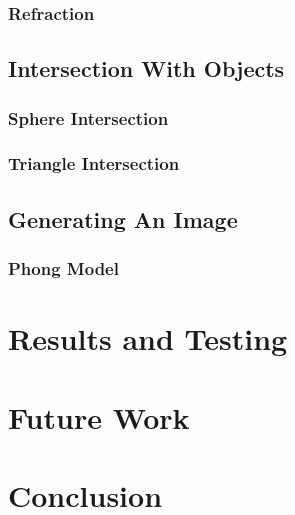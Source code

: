 \documentclass[final]{cmpreport}
\begin{document}
\subsubsection{Refraction}

\subsection{Intersection With Objects}

\subsubsection{Sphere Intersection}

\subsubsection{Triangle Intersection}

\subsection{Generating An Image}

\subsubsection{Phong Model}

\section{Results and Testing}

\section{Future Work}

\section{Conclusion}
\end{document}
